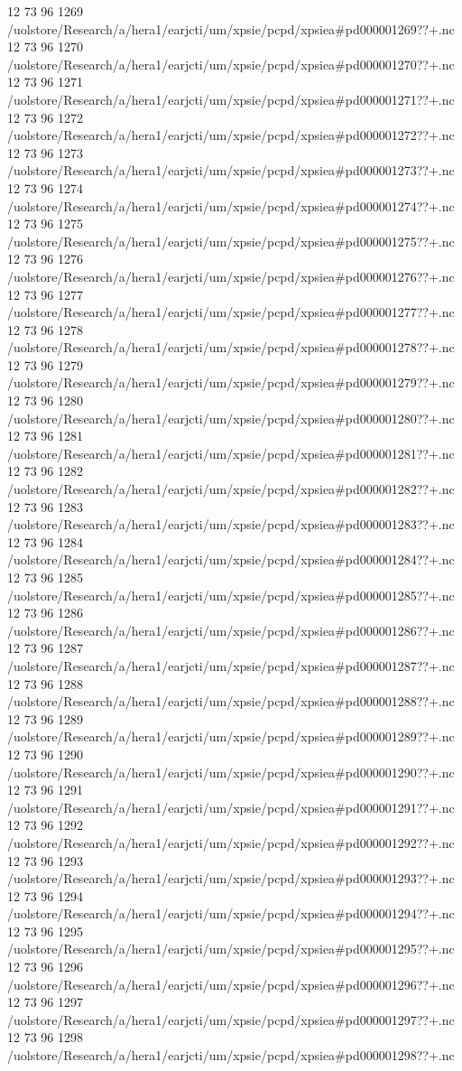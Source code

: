 12 73 96
1269
/uolstore/Research/a/hera1/earjcti/um/xpsie/pcpd/xpsiea#pd000001269??+.nc
12 73 96
1270
/uolstore/Research/a/hera1/earjcti/um/xpsie/pcpd/xpsiea#pd000001270??+.nc
12 73 96
1271
/uolstore/Research/a/hera1/earjcti/um/xpsie/pcpd/xpsiea#pd000001271??+.nc
12 73 96
1272
/uolstore/Research/a/hera1/earjcti/um/xpsie/pcpd/xpsiea#pd000001272??+.nc
12 73 96
1273
/uolstore/Research/a/hera1/earjcti/um/xpsie/pcpd/xpsiea#pd000001273??+.nc
12 73 96
1274
/uolstore/Research/a/hera1/earjcti/um/xpsie/pcpd/xpsiea#pd000001274??+.nc
12 73 96
1275
/uolstore/Research/a/hera1/earjcti/um/xpsie/pcpd/xpsiea#pd000001275??+.nc
12 73 96
1276
/uolstore/Research/a/hera1/earjcti/um/xpsie/pcpd/xpsiea#pd000001276??+.nc
12 73 96
1277
/uolstore/Research/a/hera1/earjcti/um/xpsie/pcpd/xpsiea#pd000001277??+.nc
12 73 96
1278
/uolstore/Research/a/hera1/earjcti/um/xpsie/pcpd/xpsiea#pd000001278??+.nc
12 73 96
1279
/uolstore/Research/a/hera1/earjcti/um/xpsie/pcpd/xpsiea#pd000001279??+.nc
12 73 96
1280
/uolstore/Research/a/hera1/earjcti/um/xpsie/pcpd/xpsiea#pd000001280??+.nc
12 73 96
1281
/uolstore/Research/a/hera1/earjcti/um/xpsie/pcpd/xpsiea#pd000001281??+.nc
12 73 96
1282
/uolstore/Research/a/hera1/earjcti/um/xpsie/pcpd/xpsiea#pd000001282??+.nc
12 73 96
1283
/uolstore/Research/a/hera1/earjcti/um/xpsie/pcpd/xpsiea#pd000001283??+.nc
12 73 96
1284
/uolstore/Research/a/hera1/earjcti/um/xpsie/pcpd/xpsiea#pd000001284??+.nc
12 73 96
1285
/uolstore/Research/a/hera1/earjcti/um/xpsie/pcpd/xpsiea#pd000001285??+.nc
12 73 96
1286
/uolstore/Research/a/hera1/earjcti/um/xpsie/pcpd/xpsiea#pd000001286??+.nc
12 73 96
1287
/uolstore/Research/a/hera1/earjcti/um/xpsie/pcpd/xpsiea#pd000001287??+.nc
12 73 96
1288
/uolstore/Research/a/hera1/earjcti/um/xpsie/pcpd/xpsiea#pd000001288??+.nc
12 73 96
1289
/uolstore/Research/a/hera1/earjcti/um/xpsie/pcpd/xpsiea#pd000001289??+.nc
12 73 96
1290
/uolstore/Research/a/hera1/earjcti/um/xpsie/pcpd/xpsiea#pd000001290??+.nc
12 73 96
1291
/uolstore/Research/a/hera1/earjcti/um/xpsie/pcpd/xpsiea#pd000001291??+.nc
12 73 96
1292
/uolstore/Research/a/hera1/earjcti/um/xpsie/pcpd/xpsiea#pd000001292??+.nc
12 73 96
1293
/uolstore/Research/a/hera1/earjcti/um/xpsie/pcpd/xpsiea#pd000001293??+.nc
12 73 96
1294
/uolstore/Research/a/hera1/earjcti/um/xpsie/pcpd/xpsiea#pd000001294??+.nc
12 73 96
1295
/uolstore/Research/a/hera1/earjcti/um/xpsie/pcpd/xpsiea#pd000001295??+.nc
12 73 96
1296
/uolstore/Research/a/hera1/earjcti/um/xpsie/pcpd/xpsiea#pd000001296??+.nc
12 73 96
1297
/uolstore/Research/a/hera1/earjcti/um/xpsie/pcpd/xpsiea#pd000001297??+.nc
12 73 96
1298
/uolstore/Research/a/hera1/earjcti/um/xpsie/pcpd/xpsiea#pd000001298??+.nc

